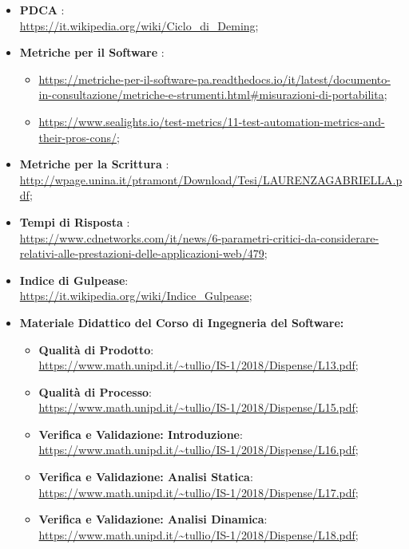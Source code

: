 	\begin{itemize}
		\item \textbf{PDCA} :\\ \url{https://it.wikipedia.org/wiki/Ciclo_di_Deming};
		\item \textbf{Metriche per il Software} :
			\begin{itemize}
			\item \url{https://metriche-per-il-software-pa.readthedocs.io/it/latest/documento-in-consultazione/metriche-e-strumenti.html#misurazioni-di-portabilita};
			\item \url{https://www.sealights.io/test-metrics/11-test-automation-metrics-and-their-pros-cons/};
			\end{itemize}
		\item \textbf{Metriche per la Scrittura} :\\\url{http://wpage.unina.it/ptramont/Download/Tesi/LAURENZAGABRIELLA.pdf};
		\item \textbf{Tempi di Risposta} :\\ \url{https://www.cdnetworks.com/it/news/6-parametri-critici-da-considerare-relativi-alle-prestazioni-delle-applicazioni-web/479};
		\item \textbf{Indice di Gulpease}: \\ \url{https://it.wikipedia.org/wiki/Indice_Gulpease};
		
		
		\item \textbf{Materiale Didattico del Corso di Ingegneria del Software:}
			\begin{itemize}
				\item \textbf{Qualità di Prodotto}: \\ \url{https://www.math.unipd.it/~tullio/IS-1/2018/Dispense/L13.pdf};
				
				\item \textbf{Qualità di Processo}: \\ \url{https://www.math.unipd.it/~tullio/IS-1/2018/Dispense/L15.pdf};
				
				\item \textbf{Verifica e Validazione: Introduzione}: \\ \url{https://www.math.unipd.it/~tullio/IS-1/2018/Dispense/L16.pdf};
				
				\item \textbf{Verifica e Validazione: Analisi Statica}: \\ \url{https://www.math.unipd.it/~tullio/IS-1/2018/Dispense/L17.pdf};
				\item \textbf{Verifica e Validazione: Analisi Dinamica}: \\ \url{https://www.math.unipd.it/~tullio/IS-1/2018/Dispense/L18.pdf};
			\end{itemize}
			

\end{itemize}
